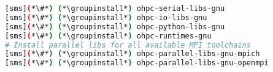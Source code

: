 
\begin{lstlisting}[language=bash,keywords={},upquote=true,keepspaces]
[sms](*\#*) (*\groupinstall*) ohpc-serial-libs-gnu
[sms](*\#*) (*\groupinstall*) ohpc-io-libs-gnu
[sms](*\#*) (*\groupinstall*) ohpc-python-libs-gnu
[sms](*\#*) (*\groupinstall*) ohpc-runtimes-gnu
# Install parallel libs for all available MPI toolchains
[sms](*\#*) (*\groupinstall*) ohpc-parallel-libs-gnu-mpich
[sms](*\#*) (*\groupinstall*) ohpc-parallel-libs-gnu-openmpi
\end{lstlisting}

